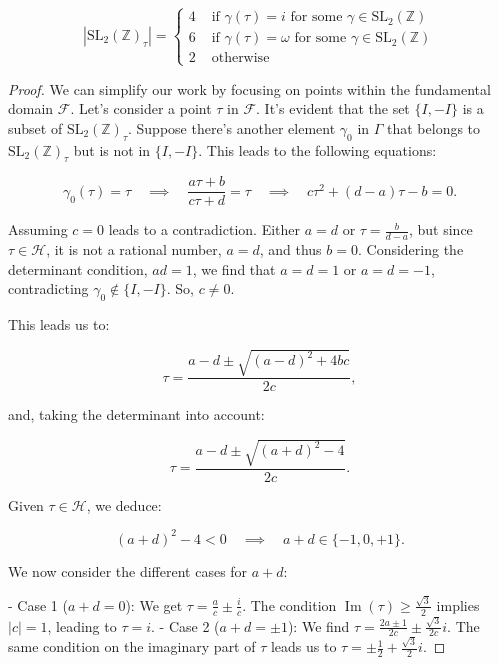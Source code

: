 \begin{proposition}
    $$
\left|\mathrm{SL}_{2}(\mathbb{Z})_{\tau}\right|= \begin{cases}4 & \text { if } \gamma(\tau)=i \text { for some } \gamma \in \mathrm{SL}_{2}(\mathbb{Z}) \\ 6 & \text { if } \gamma(\tau)=\omega \text { for some } \gamma \in \mathrm{SL}_{2}(\mathbb{Z}) \\ 2 & \text { otherwise }\end{cases}
$$
\begin{proof}

We can simplify our work by focusing on points within the fundamental domain \( \mathcal{F} \). Let's consider a point \( \tau \) in \( \mathcal{F} \). It's evident that the set \( \{I, -I\} \) is a subset of \( \mathrm{SL}_{2}(\mathbb{Z})_{\tau} \). Suppose there's another element \( \gamma_{0} \) in \( \Gamma \) that belongs to \( \mathrm{SL}_{2}(\mathbb{Z})_{\tau} \) but is not in \( \{I, -I\} \). This leads to the following equations:

\[
\gamma_{0}(\tau) = \tau \quad \implies \quad \frac{a\tau + b}{c\tau + d} = \tau \quad \implies \quad c\tau^2 + (d-a)\tau - b = 0.
\]

Assuming \( c = 0 \) leads to a contradiction. Either \( a = d \) or \( \tau = \frac{b}{d-a} \), but since \( \tau \in \mathcal{H} \), it is not a rational number, \( a = d \), and thus \( b = 0 \). Considering the determinant condition, \( ad = 1 \), we find that \( a = d = 1 \) or \( a = d = -1 \), contradicting \( \gamma_{0} \notin \{I, -I\} \). So, \( c \neq 0 \).

This leads us to:

\[
\tau = \frac{a - d \pm \sqrt{(a - d)^2 + 4bc}}{2c},
\]

and, taking the determinant into account:

\[
\tau = \frac{a - d \pm \sqrt{(a + d)^2 - 4}}{2c}.
\]

Given \( \tau \in \mathcal{H} \), we deduce:

\[
(a + d)^2 - 4 < 0 \quad \implies \quad a + d \in \{-1, 0, +1\}.
\]

We now consider the different cases for \( a + d \):

- Case 1 (\( a + d = 0 \)): We get \( \tau = \frac{a}{c} \pm \frac{i}{c} \). The condition \( \operatorname{Im}(\tau) \geq \frac{\sqrt{3}}{2} \) implies \( |c| = 1 \), leading to \( \tau = i \).
- Case 2 (\( a + d = \pm 1 \)): We find \( \tau = \frac{2a \pm 1}{2c} \pm \frac{\sqrt{3}}{2c}i \). The same condition on the imaginary part of \( \tau \) leads us to \( \tau = \pm \frac{1}{2} + \frac{\sqrt{3}}{2}i \).


\end{proof}
\end{proposition}
